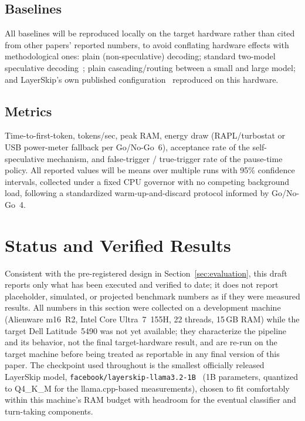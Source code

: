 \documentclass[journal]{IEEEtran}
\begin{document}
\subsection{Baselines}
All baselines will be reproduced locally on the target hardware rather than cited from other papers' reported numbers, to avoid conflating hardware effects with methodological ones: plain (non-speculative) decoding; standard two-model speculative decoding~\cite{leviathan2023fast}; plain cascading/routing between a small and large model; and LayerSkip's own published configuration~\cite{elhoushi2024layerskip} reproduced on this hardware.

\subsection{Metrics}
Time-to-first-token, tokens/sec, peak RAM, energy draw (RAPL/turbostat or USB power-meter fallback per Go/No-Go~6), acceptance rate of the self-speculative mechanism, and false-trigger / true-trigger rate of the pause-time policy. All reported values will be means over multiple runs with 95\% confidence intervals, collected under a fixed CPU governor with no competing background load, following a standardized warm-up-and-discard protocol informed by Go/No-Go~4.

\section{Status and Verified Results}
\label{sec:status}

Consistent with the pre-registered design in Section~\ref{sec:evaluation}, this draft reports only what has been executed and verified to date; it does not report placeholder, simulated, or projected benchmark numbers as if they were measured results. All numbers in this section were collected on a development machine (Alienware m16~R2, Intel Core Ultra~7~155H, 22 threads, 15\,GB RAM) while the target Dell Latitude~5490 was not yet available; they characterize the pipeline and its behavior, not the final target-hardware result, and are re-run on the target machine before being treated as reportable in any final version of this paper. The checkpoint used throughout is the smallest officially released LayerSkip model, \texttt{facebook/layerskip-llama3.2-1B}~\cite{elhoushi2024layerskip} (1B parameters, quantized to Q4\_K\_M for the llama.cpp-based measurements), chosen to fit comfortably within this machine's RAM budget with headroom for the eventual classifier and turn-taking components.
\end{document}
